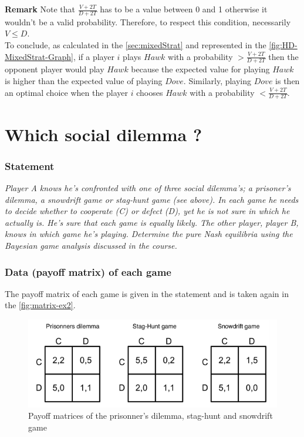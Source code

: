 \documentclass{article}
\begin{document}
\textbf{Remark} Note that $\frac{V+2T}{D+2T}$ has to be a value between 0 and 1 otherwise it wouldn't be a valid probability. Therefore, to respect this condition, necessarily $V \le D $. \\

To conclude, as calculated in the \autoref{sec:mixedStrat} and represented in the \autoref{fig:HD-MixedStrat-Graph}, if a player $i$ plays $Hawk$ with a probability $ >  \frac{V+2T}{D+2T}$ then the opponent player would play $Hawk$ because the expected value for playing $Hawk$ is higher than the expected value of playing $Dove$. Similarly, playing $Dove$ is then an optimal choice when the player $i$ chooses $Hawk$ with a probability $ < \frac{V+2T}{D+2T}$.

\newpage
\section{Which social dilemma ?}

\subsubsection*{Statement}

\textit{Player A knows he’s	confronted with	one	of three social	dilemma’s; a prisoner’s	
dilemma, a snowdrift game or stag-hunt game	(see above). In	each game he needs to decide	whether	to cooperate (C) or	defect (D),	yet	he is not sure in which	he actually	is.		He’s sure that each	game is	equally	likely.	The	other player, player B, knows in which	game he’s playing. Determine the pure Nash equilibria using	the	Bayesian game analysis	discussed in the course.} 

\subsubsection*{Data (payoff matrix) of each game}

The payoff matrix of each game is given in the statement and is taken again in the \autoref{fig:matrix-ex2}.  

\begin{figure}[h]
  \centering
  \includegraphics[scale=0.6]{figures/matrix-ex2.png}
  \caption{Payoff matrices of the prisonner's dilemma, stag-hunt and snowdrift game}
  \label{fig:matrix-ex2}
\end{figure}
\end{document}
